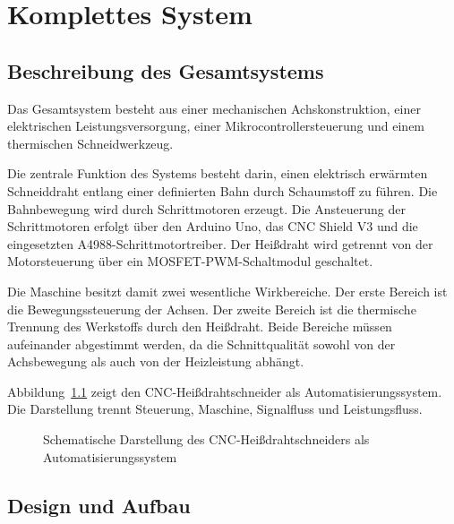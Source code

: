 %
%
%


\chapter{Komplettes System}
\label{chap:komplettes_system}

\section{Beschreibung des Gesamtsystems}
\label{sec:komplettes_system_beschreibung}

Das Gesamtsystem besteht aus einer mechanischen Achskonstruktion, einer elektrischen Leistungsversorgung, einer Mikrocontrollersteuerung und einem thermischen Schneidwerkzeug. 

Die zentrale Funktion des Systems besteht darin, einen elektrisch erwärmten Schneiddraht entlang einer definierten Bahn durch Schaumstoff zu führen. Die Bahnbewegung wird durch Schrittmotoren erzeugt. Die Ansteuerung der Schrittmotoren erfolgt über den Arduino Uno, das CNC Shield V3 und die eingesetzten A4988-Schrittmotortreiber. Der Heißdraht wird getrennt von der Motorsteuerung über ein MOSFET-PWM-Schaltmodul geschaltet.

Die Maschine besitzt damit zwei wesentliche Wirkbereiche. Der erste Bereich ist die Bewegungssteuerung der Achsen. Der zweite Bereich ist die thermische Trennung des Werkstoffs durch den Heißdraht. Beide Bereiche müssen aufeinander abgestimmt werden, da die Schnittqualität sowohl von der Achsbewegung als auch von der Heizleistung abhängt.

Abbildung~\ref{fig:automatisierungssystem_cnc} zeigt den CNC-Heißdrahtschneider als Automatisierungssystem. Die Darstellung trennt Steuerung, Maschine, Signalfluss und Leistungsfluss.

\begin{figure}[H]
	\centering
	\resizebox{0.78\textwidth}{!}{%
		
	}
	\caption{Schematische Darstellung des CNC-Heißdrahtschneiders als Automatisierungssystem}
	\label{fig:automatisierungssystem_cnc}
\end{figure}

\section{Design und Aufbau}
\label{sec:komplettes_system_design_aufbau}


